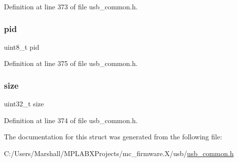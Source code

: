 Definition at line 373 of file usb\+\_\+common.\+h.

\mbox{\label{struct__transfer__event__data_a108af4844b813f4ea332bab4e84aa87e}} 
\subsubsection{\texorpdfstring{pid}{pid}}
{\footnotesize\ttfamily uint8\+\_\+t pid}



Definition at line 375 of file usb\+\_\+common.\+h.

\mbox{\label{struct__transfer__event__data_ab2c6b258f02add8fdf4cfc7c371dd772}} 
\subsubsection{\texorpdfstring{size}{size}}
{\footnotesize\ttfamily uint32\+\_\+t size}



Definition at line 374 of file usb\+\_\+common.\+h.



The documentation for this struct was generated from the following file\+:\begin{DoxyCompactItemize}
\item 
C\+:/\+Users/\+Marshall/\+M\+P\+L\+A\+B\+X\+Projects/mc\+\_\+firmware.\+X/usb/\mbox{\hyperlink{usb__common_8h}{usb\+\_\+common.\+h}}\end{DoxyCompactItemize}
